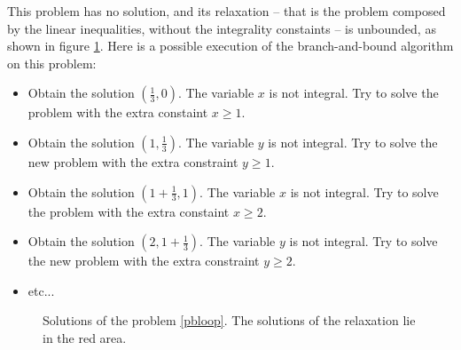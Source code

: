 \documentclass{article}
\begin{document}
This problem has no solution, and its relaxation -- that is the problem
composed by the linear inequalities, without the integrality constaints -- is
unbounded, as shown in figure \ref{bbloop}. Here is a possible execution of the
branch-and-bound algorithm on this problem:
\begin{itemize}
  \item Obtain the solution $(\frac{1}{3}, 0)$. The variable $x$ is not
    integral. Try to solve the problem with the extra constaint
    $x \geqslant 1$.
  \item Obtain the solution $(1, \frac{1}{3})$. The variable $y$ is not
    integral. Try to solve the new problem with the extra constraint $y
    \geqslant 1$.
  \item Obtain the solution $(1 + \frac{1}{3}, 1)$. The variable $x$ is not
    integral. Try to solve the problem with the extra constaint
    $x \geqslant 2$.
  \item Obtain the solution $(2, 1 + \frac{1}{3})$. The variable $y$ is not
    integral. Try to solve the new problem with the extra constraint $y
    \geqslant 2$.
  \item etc...
\end{itemize}


\begin{figure}[h]
  \centering


  \label{bbloop}
  \caption{Solutions of the problem
           \ref{pbloop}. The solutions of the relaxation lie in the red area.}
\end{figure}
\end{document}
